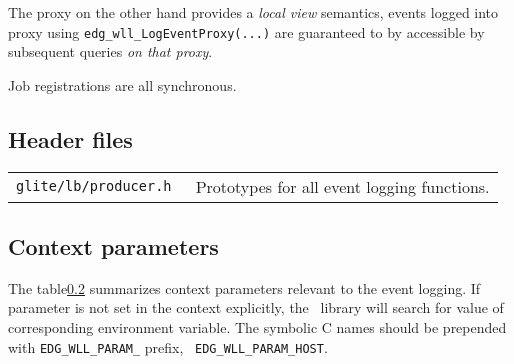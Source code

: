 The \LB proxy on the other hand provides a \emph{local view}
semantics, events logged into proxy using
\verb'edg_wll_LogEventProxy(...)' are guaranteed to by accessible by
subsequent queries \emph{on that proxy}.

Job registrations are all synchronous.

\subsection{Header files}

\begin{table}[h]
\begin{tabularx}{\textwidth}{>{\tt}lX}
glite/lb/producer.h & Prototypes for all event logging functions. \\
\end{tabularx}
\end{table}

\subsection{Context parameters}
The table\ref{} summarizes context parameters relevant to the
event logging. If  parameter is not set in the context explicitly, the
\LB\ library will search for value of corresponding environment
variable. The symbolic C names should be prepended with
\verb'EDG_WLL_PARAM_' prefix, \ie\ \verb'EDG_WLL_PARAM_HOST'.

